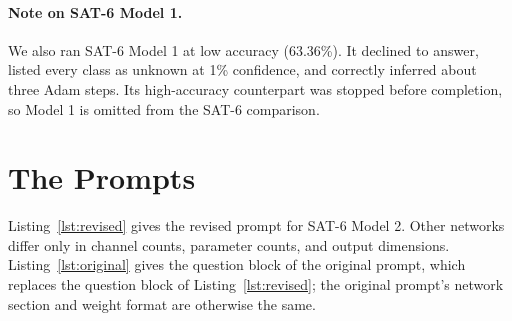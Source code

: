 \documentclass[11pt]{article}
\begin{document}
\paragraph{Note on SAT-6 Model 1.} We also ran SAT-6 Model 1 at low accuracy (63.36\%). It declined to answer, listed every class as unknown at 1\% confidence, and correctly inferred about three Adam steps. Its high-accuracy counterpart was stopped before completion, so Model 1 is omitted from the SAT-6 comparison.

\section{The Prompts}
\label{app:prompts}

Listing~\ref{lst:revised} gives the revised prompt for SAT-6 Model 2. Other networks differ only in channel counts, parameter counts, and output dimensions. Listing~\ref{lst:original} gives the question block of the original prompt, which replaces the question block of Listing~\ref{lst:revised}; the original prompt's network section and weight format are otherwise the same.
\end{document}
